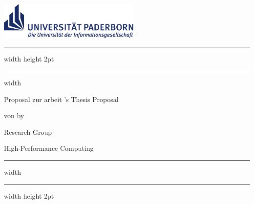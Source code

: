 \thispagestyle{plain}

\includegraphics[width=7cm]{figures/upb_logo}

\bigskip

\hrule width \hsize height 2pt \kern 1mm \hrule width \hsize
\vspace*{6pt}

\begin{center}
	\Large\textbf{\Title}
\end{center}

\noindent
\begin{minipage}{6cm}
	\large{
		\ifgerman
			Proposal zur \Degree arbeit
		\else
			\Degree 's Thesis Proposal
		\fi
	}

	\ifgerman
		\large von
	\else
		\large by
	\fi
	\Author
\end{minipage}
\hfill
\begin{minipage}{6cm}
	\flushright
	\normalsize Research Group

	High-Performance Computing
\end{minipage}

\bigskip

\hrule width \hsize \kern 1mm \hrule width \hsize height 2pt
